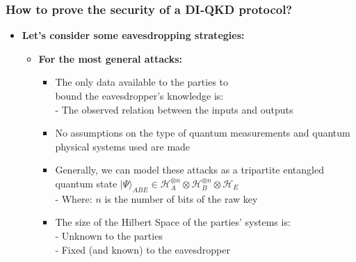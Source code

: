 \documentclass{beamer}
\begin{document}
		\begin{frame}
			\frametitle{\large How to prove the security of a DI‑QKD protocol?}

            \vspace{3ex}
            \begin{itemize}
                \item \textbf{Let's consider some eavesdropping strategies:}
                \begin{itemize}
                    \item \textbf{For the most general attacks:}
                    \begin{itemize}
                        \small
                        \item The only data available to the parties to\\ bound the eavesdropper's knowledge is:\\
                        \footnotesize
                        - The observed relation between the inputs and outputs
                        \vspace{1ex}
                        \small
                        \item No assumptions on the type of quantum measurements and quantum physical systems used are made
                        \vspace{2ex}
                        \small
                        \item Generally, we can model these attacks as a tripartite entangled quantum state ${|\Psi\rangle}_{ABE} \in {\mathcal{H}}_{A}^{\otimes n} \otimes {\mathcal{H}}_{B}^{\otimes n} \otimes {\mathcal{H}}_{E}$\\
                        \vspace{0.75ex}
                        \footnotesize
                        - Where: $n$ is the number of bits of the raw key
                        \vspace{2ex}
                        \small
                        \item The size of the Hilbert Space of the parties' systems is:\\
                        \footnotesize
                        - Unknown to the parties\\
                        - Fixed (and known) to the eavesdropper
                    \end{itemize}
                \end{itemize}
            \end{itemize}
		\end{frame}
\end{document}
